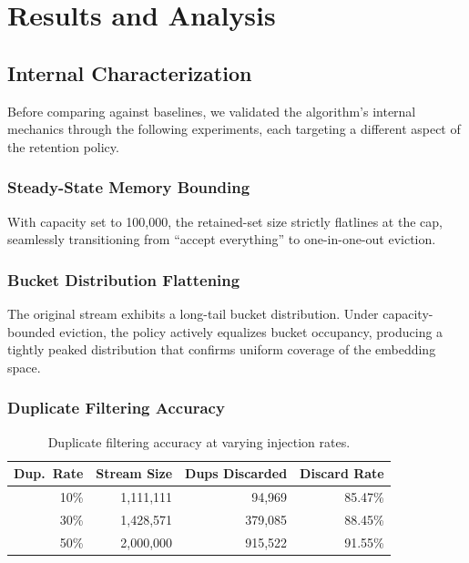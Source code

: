 \documentclass[conference]{IEEEtran}
\begin{document}
\section{Results and Analysis}

\subsection{Internal Characterization}
Before comparing against baselines, we validated the algorithm's
internal mechanics through the following experiments, each targeting a
different aspect of the retention policy.

\subsubsection{Steady-State Memory Bounding}
With capacity set to 100,000, the retained-set size strictly flatlines
at the cap, seamlessly transitioning from ``accept everything'' to
one-in-one-out eviction.

\subsubsection{Bucket Distribution Flattening}
The original stream exhibits a long-tail bucket distribution. Under
capacity-bounded eviction, the policy actively equalizes bucket
occupancy, producing a tightly peaked distribution that confirms
uniform coverage of the embedding space.

\subsubsection{Duplicate Filtering Accuracy}

\begin{table}[h]
\centering
\caption{Duplicate filtering accuracy at varying injection rates.}
\label{tab:dup-filter}
\begin{tabular}{@{}rrrr@{}}
\toprule
Dup.\ Rate & Stream Size & Dups Discarded & Discard Rate \\
\midrule
10\% & 1,111,111 &  94,969 & 85.47\% \\
30\% & 1,428,571 & 379,085 & 88.45\% \\
50\% & 2,000,000 & 915,522 & 91.55\% \\
\bottomrule
\end{tabular}
\end{table}
\end{document}
